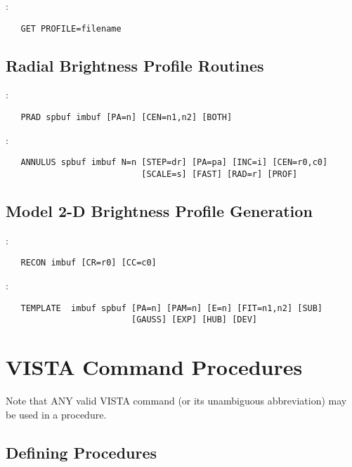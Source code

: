 \noindent {}:
\begin{verbatim}
   GET PROFILE=filename
\end{verbatim}

\subsection{Radial Brightness Profile Routines}

:
\begin{verbatim}
   PRAD spbuf imbuf [PA=n] [CEN=n1,n2] [BOTH]
\end{verbatim}

\noindent {}:
\begin{verbatim}
   ANNULUS spbuf imbuf N=n [STEP=dr] [PA=pa] [INC=i] [CEN=r0,c0]
                           [SCALE=s] [FAST] [RAD=r] [PROF]
\end{verbatim}

\subsection{Model 2-D Brightness Profile Generation}

:
\begin{verbatim}
   RECON imbuf [CR=r0] [CC=c0]
\end{verbatim}

\noindent {}:
\begin{verbatim}
   TEMPLATE  imbuf spbuf [PA=n] [PAM=n] [E=n] [FIT=n1,n2] [SUB]
                         [GAUSS] [EXP] [HUB] [DEV]
\end{verbatim}


\section{VISTA Command Procedures}

Note that ANY valid VISTA command (or its unambiguous abbreviation) may be
used in a procedure.

\subsection{Defining Procedures}


